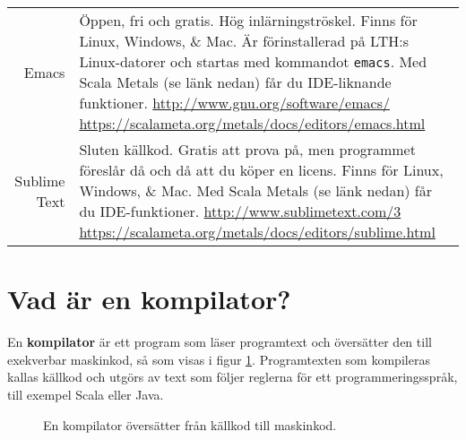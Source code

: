 \begin{table}
\begin{longtable}{@{}r | p{}}
Emacs & Öppen, fri och gratis. Hög inlärningströskel. Finns för Linux, Windows, \& Mac. Är förinstallerad på LTH:s Linux-datorer och startas med kommandot \verb+emacs+. Med Scala Metals (se länk nedan) får du IDE-liknande funktioner. \newline \url{http://www.gnu.org/software/emacs/} \newline \url{https://scalameta.org/metals/docs/editors/emacs.html}\\

Sublime Text& Sluten källkod. Gratis att prova på, men programmet föreslår då och då att du köper en licens. Finns för Linux, Windows, \& Mac. Med Scala Metals (se länk nedan) får du IDE-funktioner. \newline \url{http://www.sublimetext.com/3} \newline \url{https://scalameta.org/metals/docs/editors/sublime.html} \\




\end{longtable}

\end{table}

\section{Vad är en kompilator?}

En \textbf{kompilator}  är ett program som läser programtext och översätter den till exekverbar maskinkod, så som visas i figur \ref{fig:appendix:compiler}. Programtexten som kompileras kallas källkod och utgörs av text som följer reglerna för ett programmeringsspråk, till exempel Scala eller Java.

\begin{figure}[H]
\centering
{}
    \caption{En kompilator översätter från källkod till maskinkod.}
    \label{fig:appendix:compiler}
\end{figure}




